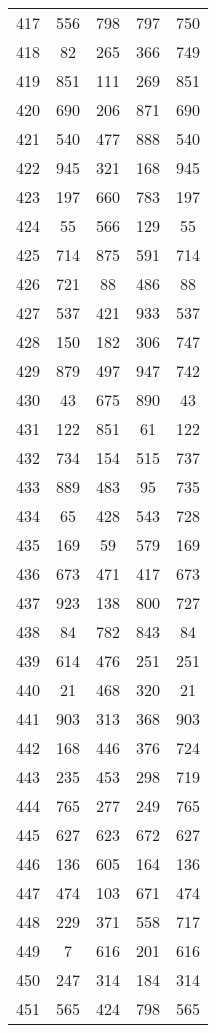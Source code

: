 \documentclass[a4paper,10pt,ngerman]{scrartcl}
\begin{document}
\begin{longtable}[c]{c|c|c|c|c}
    417 & 556 & 798 & 797 & 750 \\
    418 & 82 & 265 & 366 & 749 \\
    419 & 851 & 111 & 269 & 851 \\
    420 & 690 & 206 & 871 & 690 \\
    421 & 540 & 477 & 888 & 540 \\
    422 & 945 & 321 & 168 & 945 \\
    423 & 197 & 660 & 783 & 197 \\
    424 & 55 & 566 & 129 & 55 \\
    425 & 714 & 875 & 591 & 714 \\
    426 & 721 & 88 & 486 & 88 \\
    427 & 537 & 421 & 933 & 537 \\
    428 & 150 & 182 & 306 & 747 \\
    429 & 879 & 497 & 947 & 742 \\
    430 & 43 & 675 & 890 & 43 \\
    431 & 122 & 851 & 61 & 122 \\
    432 & 734 & 154 & 515 & 737 \\
    433 & 889 & 483 & 95 & 735 \\
    434 & 65 & 428 & 543 & 728 \\
    435 & 169 & 59 & 579 & 169 \\
    436 & 673 & 471 & 417 & 673 \\
    437 & 923 & 138 & 800 & 727 \\
    438 & 84 & 782 & 843 & 84 \\
    439 & 614 & 476 & 251 & 251 \\
    440 & 21 & 468 & 320 & 21 \\
    441 & 903 & 313 & 368 & 903 \\
    442 & 168 & 446 & 376 & 724 \\
    443 & 235 & 453 & 298 & 719 \\
    444 & 765 & 277 & 249 & 765 \\
    445 & 627 & 623 & 672 & 627 \\
    446 & 136 & 605 & 164 & 136 \\
    447 & 474 & 103 & 671 & 474 \\
    448 & 229 & 371 & 558 & 717 \\
    449 & 7 & 616 & 201 & 616 \\
    450 & 247 & 314 & 184 & 314 \\
    451 & 565 & 424 & 798 & 565 \\

\end{longtable}
\end{document}
